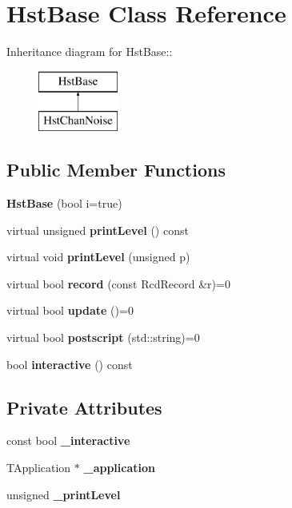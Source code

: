 \section{HstBase Class Reference}
\label{classHstBase}
Inheritance diagram for HstBase::\begin{figure}[H]
\begin{center}
\leavevmode
\includegraphics[height=2cm]{classHstBase}
\end{center}
\end{figure}
\subsection*{Public Member Functions}
\begin{DoxyCompactItemize}
\item 
{\bfseries HstBase} (bool i=true)\label{classHstBase_a36170c7c3f81997751b98e57773101ee}

\item 
virtual unsigned {\bfseries printLevel} () const \label{classHstBase_aa4f0acae99e23ea1cd2bd405259f14e2}

\item 
virtual void {\bfseries printLevel} (unsigned p)\label{classHstBase_ad125d12a8b12d0acf69da1dac0a9634c}

\item 
virtual bool {\bfseries record} (const RcdRecord \&r)=0\label{classHstBase_aedddcccf2663a04211ae01a44947d5ff}

\item 
virtual bool {\bfseries update} ()=0\label{classHstBase_a6b304127c3c6adc87ab30d1f9d4d557c}

\item 
virtual bool {\bfseries postscript} (std::string)=0\label{classHstBase_a88ed97ffe429ec2ca0d49faaf9a468ce}

\item 
bool {\bfseries interactive} () const \label{classHstBase_ac3297b878d90b6174577ef0f150cfb75}

\end{DoxyCompactItemize}
\subsection*{Private Attributes}
\begin{DoxyCompactItemize}
\item 
const bool {\bfseries \_\-interactive}\label{classHstBase_a65dd208a8144cd46de0a8c12497c5e02}

\item 
TApplication $\ast$ {\bfseries \_\-application}\label{classHstBase_a6d76a46a314f2c728bbea75f5cbb112c}

\item 
unsigned {\bfseries \_\-printLevel}\label{classHstBase_af08876ecbd5e3a7b238b94ef01aaea65}

\end{DoxyCompactItemize}


